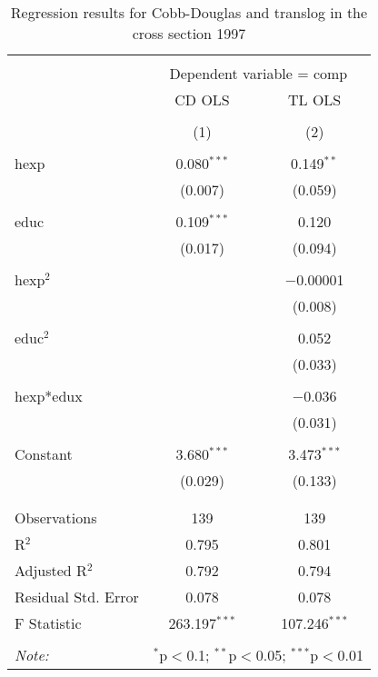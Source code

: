 \documentclass[12pt,a4paper]{article}\usepackage[]{graphicx}\usepackage[]{color}
\begin{document}
\begin{table}[!htbp] \centering 
  \caption{Regression results for Cobb-Douglas and translog in the cross section 1997} 
  \label{} 
\small 
\begin{tabular}{@{\extracolsep{5pt}}lcc} 
\\[-1.8ex]\hline 
\hline \\[-1.8ex] 
 & \multicolumn{2}{c}{Dependent variable = comp} \\ 
\cline{2-3} 
 & CD OLS & TL OLS \\ 
\\[-1.8ex] & (1) & (2)\\ 
\hline \\[-1.8ex] 
 hexp & 0.080$^{***}$ & 0.149$^{**}$ \\ 
  & (0.007) & (0.059) \\ 
  & & \\ 
 educ & 0.109$^{***}$ & 0.120 \\ 
  & (0.017) & (0.094) \\ 
  & & \\ 
 hexp$^2$ &  & $-$0.00001 \\ 
  &  & (0.008) \\ 
  & & \\ 
 educ$^2$ &  & 0.052 \\ 
  &  & (0.033) \\ 
  & & \\ 
 hexp*edux &  & $-$0.036 \\ 
  &  & (0.031) \\ 
  & & \\ 
 Constant & 3.680$^{***}$ & 3.473$^{***}$ \\ 
  & (0.029) & (0.133) \\ 
  & & \\ 
\hline \\[-1.8ex] 
Observations & 139 & 139 \\ 
R$^{2}$ & 0.795 & 0.801 \\ 
Adjusted R$^{2}$ & 0.792 & 0.794 \\ 
Residual Std. Error & 0.078 & 0.078 \\ 
F Statistic & 263.197$^{***}$ & 107.246$^{***}$ \\ 
\hline 
\hline \\[-1.8ex] 
\textit{Note:}  & \multicolumn{2}{r}{$^{*}$p$<$0.1; $^{**}$p$<$0.05; $^{***}$p$<$0.01} \\ 
\end{tabular} 
\end{table} 
\end{document}
